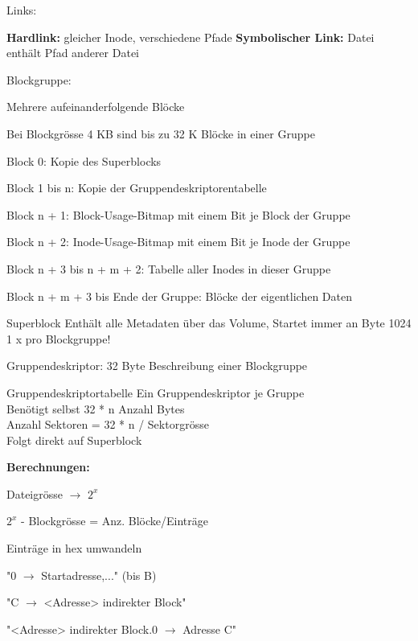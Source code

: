 \begin{multicols*}{5}
\textcolor{h}{Links:}

\textbf{Hardlink:} gleicher Inode, verschiedene Pfade
\textbf{Symbolischer Link:} Datei enthält Pfad anderer Datei

\textcolor{h}{Blockgruppe:}
\begin{compactitem}[$\bullet$]
	\item Mehrere aufeinanderfolgende Blöcke
	\item Bei Blockgrösse 4 KB sind bis zu 32 K Blöcke in einer Gruppe
	\item Block 0: Kopie des Superblocks 
	\item Block 1 bis n: Kopie der Gruppendeskriptorentabelle 
	\item Block n + 1: Block-Usage-Bitmap mit einem Bit je Block der Gruppe 
	\item Block n + 2: Inode-Usage-Bitmap mit einem Bit je Inode der Gruppe 
	\item Block n + 3 bis n + m + 2: Tabelle aller Inodes in dieser Gruppe 
	\item Block n + m + 3 bis Ende der Gruppe: Blöcke der eigentlichen Daten
\end{compactitem}

\textcolor{h}{Superblock}
Enthält alle Metadaten über das Volume, Startet immer an Byte 1024\\
1 x pro Blockgruppe!

\textcolor{h}{Gruppendeskriptor:}
32 Byte Beschreibung einer Blockgruppe


\textcolor{h}{Gruppendeskriptortabelle}
Ein Gruppendeskriptor je Gruppe\\
Benötigt selbst 32 * n Anzahl Bytes\\
Anzahl Sektoren = 32 * n / Sektorgrösse\\
Folgt direkt auf Superblock


\textbf{Berechnungen:}
\begin{compactenum}[1.]
	\item Dateigrösse $\rightarrow$ $2^{x}$
	\item $2^{x}$ - Blockgrösse = Anz. Blöcke/Einträge
	\item Einträge in hex umwandeln
	\item "0 $\rightarrow$ Startadresse,..." (bis B)
	\item "C $\rightarrow$ <Adresse> indirekter Block"
	\item "<Adresse> indirekter Block.0 $\rightarrow$ Adresse C"
\end{compactenum}








\end{multicols*}
